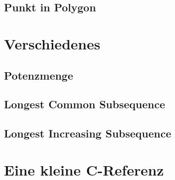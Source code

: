 \documentclass[10pt,a4paper,ngerman]{article}
\begin{document}
\subsection{Punkt in Polygon}

\section{Verschiedenes}
\subsection{Potenzmenge}

\subsection{Longest Common Subsequence}

\subsection{Longest Increasing Subsequence}

\section{Eine kleine C-Referenz}




\end{document}
